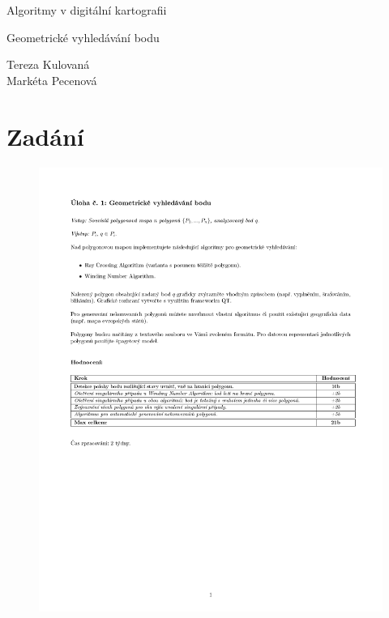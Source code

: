 \documentclass[a4paper, 12pt]{article}
\begin{document}
\begin{titlepage}
\begin{center}
\Huge
\vspace{4cm}
Algoritmy v digitální kartografii \\
\vspace{0.2cm}

\Large  
Geometrické vyhledávání bodu\\
\vspace{20cm}
\end{center}

\begin{flushright}
\Large
Tereza Kulovaná \\
Markéta Pecenová \\
\end{flushright}

\end{titlepage}


\pagestyle{plain}     %
\setcounter{page}{1}  %

\tableofcontents
\newpage

\section{Zadání}
\begin{figure}[h!]
	\includegraphics[clip, trim=0cm 10cm 0cm 3cm, width=1.0\textwidth]{./pictures/zadani.pdf}
\end{figure}
\end{document}
